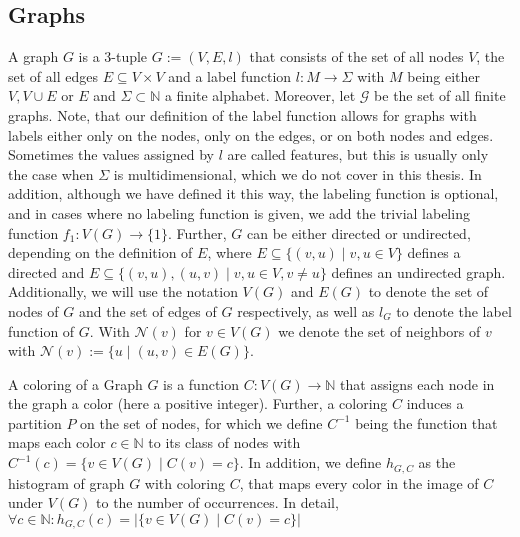 \documentclass[11pt, dvipsnames, DIV=12]{scrreprt}
\theoremstyle{definition}
\begin{document}
\subsection{Graphs}
A graph $G$ is a 3-tuple $G:= (V, E, l)$ that consists of the set of all nodes $V$, the set of all edges $E \subseteq V \times V$ and a label function $l: M \rightarrow \Sigma$ with $M$ being either $V, V \cup E$ or $E$ and $\Sigma \subset \mathbb{N}$ a finite alphabet. Moreover, let $\mathcal{G}$ be the set of all finite graphs. Note, that our definition of the label function allows for graphs with labels either only on the nodes, only on the edges, or on both nodes and edges. Sometimes the values assigned by $l$ are called features, but this is usually only the case when $\Sigma$ is multidimensional, which we do not cover in this thesis. In addition, although we have defined it this way, the labeling function is optional, and in cases where no labeling function is given, we add the trivial labeling function $f_1: V(G) \rightarrow \{1\}$. Further, $G$ can be either directed or undirected, depending on the definition of $E$, where $E \subseteq \{(v,u) \mid v,u \in V\}$ defines a directed and $E \subseteq \{(v, u), (u,v) \mid v,u \in V, v\neq u\}$ defines an undirected graph. Additionally, we will use the notation $V(G)$ and $E(G)$ to denote the set of nodes of $G$ and the set of edges of $G$ respectively, as well as $l_G$ to denote the label function of $G$. With $\mathcal{N}(v)$ for $v \in V(G)$ we denote the set of neighbors of $v$ with $\mathcal{N}(v) := \{u \mid (u, v) \in E(G)\}$.

A coloring of a Graph $G$ is a function $C: V(G) \rightarrow \mathbb{N}$ that assigns each node in the graph a color (here a positive integer). Further, a coloring $C$ induces a partition $P$ on the set of nodes, for which we define $C^{-1}$ being the function that maps each color $c \in \mathbb{N}$ to its class of nodes with $C^{-1}(c) = \{ v\in V(G) \mid C(v) = c\}$. In addition, we define $h_{G, C}$ as the histogram of graph $G$ with coloring $C$, that maps every color in the image of $C$ under $V(G)$ to the number of occurrences. In detail, $\forall c \in \mathbb{N}: h_{G, C}(c) = | \{ v \in V(G) \mid C(v) = c  \} |$
\end{document}
